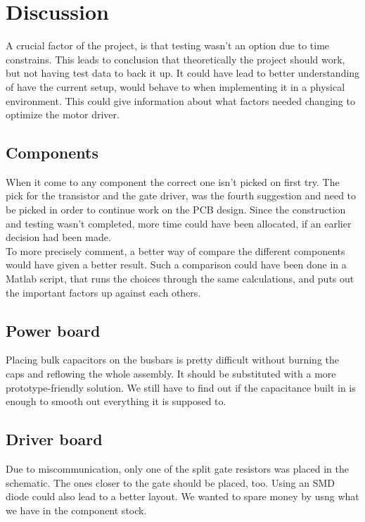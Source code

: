 \section{Discussion}
\label{sec:discussion}
 

A crucial factor of the project, is that testing wasn't an option due to time constrains. This leads to conclusion that theoretically the project should work, but not having test data to back it up. It could have lead to better understanding of 
have the current setup, would behave to when implementing it in a physical environment. This could give information about what factors needed changing to optimize the motor driver. \\ 

\subsection{Components}
When it come to any component the correct one isn't picked on first try. The pick for the transistor and the gate driver, was the fourth suggestion and need to be picked in order to continue work on the PCB design. Since the construction and testing wasn't completed, more time could have been allocated, if an earlier decision had been made. \\

To more precisely comment, a better way of compare the different components would have given a better result. Such a comparison could have been done in a Matlab script, that runs the choices through the same calculations, and puts out the important factors up against each others. \\

\subsection{Power board}
Placing bulk capacitors on the busbars is pretty difficult without burning the caps and reflowing the whole assembly. It should be substituted with a more prototype-friendly solution. We still have to find out if the capacitance built in is enough to smooth out everything it is supposed to.

\subsection{Driver board}
Due to miscommunication, only one of the split gate resistors was placed in the schematic. The ones closer to the gate should be placed, too. Using an SMD diode could also lead to a better layout. We wanted to spare money by usng what we have in the component stock.

